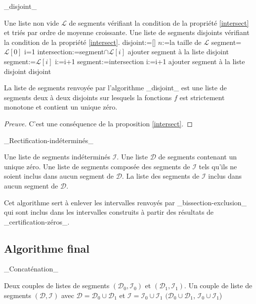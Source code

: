 \documentclass[a4paper,10pt]{article}
\begin{document}
	\begin{algorithm}
		\caption{\_disjoint\_}
		\begin{algorithmic}[1]
			\REQUIRE Une liste non vide $\mathcal{L}$ de segments vérifiant la condition de la propriété \eqref{intersect} et triés par ordre de moyenne croissante.
			\ENSURE Une liste de segments disjoints vérifiant la condition de la propriété \eqref{intersect}.
			\STATE disjoint:=[]
			\STATE $n$:=la taille de $\mathcal{L}$
			\STATE segment= $\mathcal{L}[0]$
			\STATE i=1
			\STATE intersection:=segment$\cap \mathcal{L}[i]$
			\STATE ajouter segment à la liste disjoint
			\STATE segment:=$\mathcal{L}[i]$
			\STATE i:=i+1
			\ELSE 
			\STATE segment:=intersection
			\STATE i:=i+1
			\ENDIF
			\ENDWHILE
			\STATE ajouter segment à la liste disjoint
			\RETURN disjoint
		\end{algorithmic}
	\end{algorithm}	
	\begin{proposition}
		La liste de segments renvoyée par l'algorithme \_disjoint\_ est une liste de segments deux à deux disjoints sur lesquels la fonctions $f$ est strictement monotone et contient un unique zéro. 
	\end{proposition}
	\begin{proof}[Preuve]
		C'est une conséquence de la proposition \ref{intersect}.
	\end{proof}
	\begin{algorithm}
		\caption{\_Rectification-indéterminés\_}
		\begin{algorithmic}[1]
			\REQUIRE Une liste de segments indéterminés $\mathcal{I}$. Une liste $\mathcal{D}$ de segments contenant un unique zéro.
			\ENSURE Une liste de segments composée des segments de $\mathcal{I}$ tels qu'ils ne soient inclus dans aucun segment de $\mathcal{D}$.
			\RETURN La liste des segments de $\mathcal{I}$ inclus dans aucun segment de $\mathcal{D}$.
		\end{algorithmic}
	\end{algorithm}
	Cet algorithme sert à enlever les intervalles renvoyés par \_bissection-exclusion\_ qui sont inclus dans les intervalles construits à partir des résultats de \_certification-zéros\_.
	\newpage

	\subsection{Algorithme final}
	
	\begin{algorithm}
		\caption{\_Concaténation\_}
		\begin{algorithmic}[1]
			\REQUIRE Deux couples de listes de segments $(\mathcal{D}_0,\mathcal{I}_0)$ et $(\mathcal{D}_1,\mathcal{I}_1)$.
			\ENSURE Un couple de liste de segments $(\mathcal{D},\mathcal{I})$ avec $\mathcal{D}=\mathcal{D}_0 \cup \mathcal{D}_1$ et $\mathcal{I}=\mathcal{I}_0 \cup \mathcal{I}_1$
			\RETURN $(\mathcal{D}_0 \cup \mathcal{D}_1$, $\mathcal{I}_0\cup \mathcal{I}_1$)
		\end{algorithmic}
	\end{algorithm}
\end{document}
